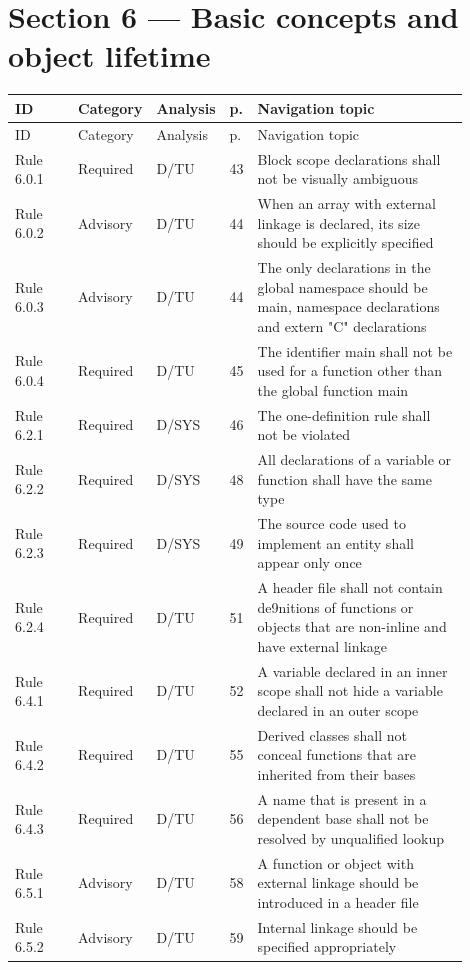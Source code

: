 \documentclass[10pt,letterpaper]{article}
\begin{document}
\section{Section 6 --- Basic concepts and object lifetime}
\small\setlength{\tabcolsep}{3pt}\renewcommand{\arraystretch}{1.15}
\begin{longtable}{p{0.14\linewidth}p{0.14\linewidth}p{0.1\linewidth}p{0.045\linewidth}p{0.475\linewidth}}
\toprule
ID & Category & Analysis & p. & Navigation topic\\ \midrule
\endfirsthead
\toprule
ID & Category & Analysis & p. & Navigation topic\\ \midrule
\endhead
Rule 6.0.1 & Required & D/TU & 43 & Block scope declarations shall not be visually ambiguous\\
Rule 6.0.2 & Advisory & D/TU & 44 & When an array with external linkage is declared, its size should be explicitly specified\\
Rule 6.0.3 & Advisory & D/TU & 44 & The only declarations in the global namespace should be main, namespace declarations and extern "C" declarations\\
Rule 6.0.4 & Required & D/TU & 45 & The identifier main shall not be used for a function other than the global function main\\
Rule 6.2.1 & Required & D/SYS & 46 & The one-definition rule shall not be violated\\
Rule 6.2.2 & Required & D/SYS & 48 & All declarations of a variable or function shall have the same type\\
Rule 6.2.3 & Required & D/SYS & 49 & The source code used to implement an entity shall appear only once\\
Rule 6.2.4 & Required & D/TU & 51 & A header file shall not contain de9nitions of functions or objects that are non-inline and have external linkage\\
Rule 6.4.1 & Required & D/TU & 52 & A variable declared in an inner scope shall not hide a variable declared in an outer scope\\
Rule 6.4.2 & Required & D/TU & 55 & Derived classes shall not conceal functions that are inherited from their bases\\
Rule 6.4.3 & Required & D/TU & 56 & A name that is present in a dependent base shall not be resolved by unqualified lookup\\
Rule 6.5.1 & Advisory & D/TU & 58 & A function or object with external linkage should be introduced in a header file\\
Rule 6.5.2 & Advisory & D/TU & 59 & Internal linkage should be specified appropriately\\

\end{longtable}
\end{document}
